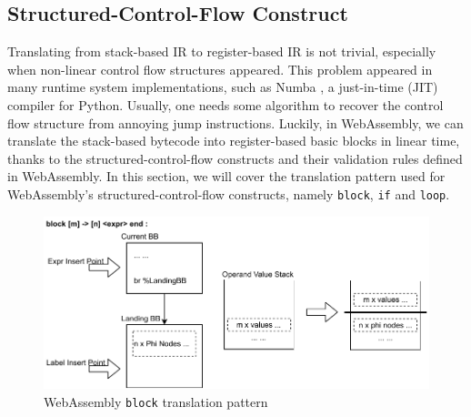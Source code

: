 \subsection{Structured-Control-Flow Construct}

Translating from stack-based IR to register-based IR is not trivial, especially when non-linear control flow structures appeared. This problem appeared in many runtime system implementations, such as Numba \cite{numba}, a just-in-time (JIT) compiler for Python. Usually, one needs some algorithm to recover the control flow structure from annoying jump instructions. Luckily, in WebAssembly, we can translate the stack-based bytecode into register-based basic blocks in linear time, thanks to the structured-control-flow constructs and their validation rules defined in WebAssembly. In this section, we will cover the translation pattern used for WebAssembly's structured-control-flow constructs, namely \texttt{block}, \texttt{if} and \texttt{loop}. 

\begin{figure}
  \centering
  \includegraphics[width=\textwidth]{Images/4.MIR/translate-block.pdf}
  \caption{WebAssembly \texttt{block} translation pattern}
  \label{fig:translate-block}
\end{figure} 

